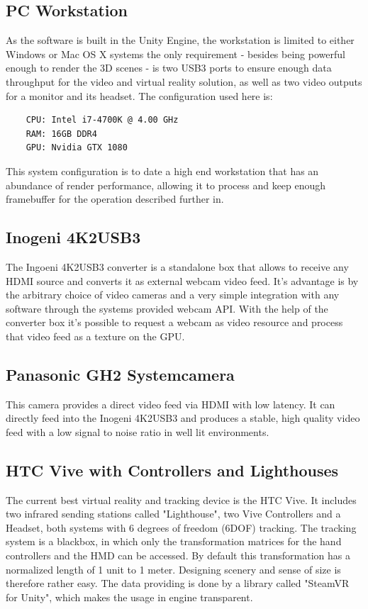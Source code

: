\subsection{PC Workstation}

As the software is built in the Unity Engine, the workstation is limited to 
either Windows or Mac OS X systems the only requirement - besides being 
powerful enough to render the 3D scenes - is two USB3 ports to ensure enough 
data throughput for the video and virtual reality solution, as well as two 
video outputs for a monitor and its headset.
\newline
The configuration used here is:
\begin{lstlisting}
	CPU: Intel i7-4700K @ 4.00 GHz
	RAM: 16GB DDR4
	GPU: Nvidia GTX 1080
\end{lstlisting}

This system configuration is to date a high end workstation that has an 
abundance of render performance, allowing it to process and keep enough 
framebuffer for the operation described further in.

\subsection{Inogeni 4K2USB3}
The Ingoeni 4K2USB3 converter is a standalone box that allows to receive any 
HDMI source and converts it as external webcam video feed. It's advantage is by 
the arbitrary choice of video cameras and a very simple integration with any 
software through the systems provided webcam API. With the help of the 
converter box it's possible to request a webcam as video resource and process 
that video feed as a texture on the GPU.

\subsection{Panasonic GH2 Systemcamera}
This camera provides a direct video feed via HDMI with low latency. It can 
directly feed into the Inogeni 4K2USB3 and produces a stable, high quality 
video feed with a low signal to noise ratio in well lit environments.

\subsection{HTC Vive with Controllers and Lighthouses}
The current best virtual reality and tracking device is the HTC Vive. It 
includes two infrared sending stations called "Lighthouse", two Vive 
Controllers and a Headset, both systems with 6 degrees of freedom (6DOF) 
tracking. The tracking system is a blackbox, in which only the transformation 
matrices for the hand controllers and the HMD can be accessed. By default this 
transformation has a normalized length of 1 unit to 1 meter. Designing scenery 
and sense of size is therefore rather easy. The data providing is done by a 
library called "SteamVR for Unity", which makes the usage in engine transparent.


